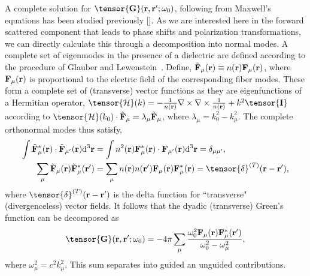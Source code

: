 \documentclass[preprint,aps,pra,onecolumn]{revtex4-1} %
\begin{document}
A complete solution for $\tensor{\mathbf{G}}(\br ,\br' ; \omega_0)$, following from Maxwell's equations 
has been studied previously [].  As we are interested here in the forward scattered component that 
leads to phase shifts and polarization transformations, we can directly calculate this through a 
decomposition into normal modes.  A complete set of eigenmodes in the presence of a dielectric are 
defined according to the procedure of Glauber and Lewenstein~\cite{Glauber1991}.  Define, 
$\tilde{\mathbf{F}}_\mu(\mathbf{r}) \equiv n(\mathbf{r}) \mathbf{F}_\mu (\mathbf{r})$, where $\mathbf{F}_\mu (\mathbf{r})$ is 
proportional to the electric field of the corresponding fiber modes.  These form a complete set of 
(transverse) vector functions as they are eigenfunctions of a Hermitian operator, 
$\tensor{\mathcal{H}}(k) = -\frac{1}{n(\br)}
\nabla\times\nabla\times \frac{1}{n(\br)} + k^2 \tensor{\mathbf{I}}$ according to 
$\tensor{\mathcal{H}}(k_0) \cdot \tilde{\mathbf{F}}_\mu = \lambda_\mu \tilde{\mathbf{F}}_\mu$, where 
$\lambda_\mu=k_0^2-k_\mu^2$.
The complete orthonormal modes thus satisfy,
\begin{align}
\int \tilde{\mathbf{F}}_\mu^* (\br)\cdot \tilde{\mathbf{F}}_{\mu'}(\br) \mathrm{d}^3\br &= \int n^2(\br) 
\mathbf{F}_\mu^* (\br)\cdot  \mathbf{F}_{\mu'}(\br) 
\mathrm{d}^3\br=\delta_{\mu\mu'},\label{eq:orthutrans}
\\
\sum_\mu \tilde{\mathbf{F}}_\mu (\br) \tilde{\mathbf{F}}_\mu^*(\br') &= \sum_\mu n(\br)n(\br') 
\mathbf{F}_\mu  (\br) \mathbf{F}_\mu^*(\br) =\tensor{\delta}^{(T)}(\br-\br'), 
\end{align}
where $\tensor{\delta}^{(T)}(\br-\br')$ is the  delta function for ``transverse" (divergenceless) vector 
fields.  It follows that the dyadic (transverse) Green's function can be decomposed as~\cite{Swedishguys}
\begin{equation}
\tensor{\mathbf{G}}(\br,\br'; \omega_0) = -4\pi \sum_{\mu} \frac{\omega_0^2\mathbf{F}_\mu (\br) 
\mathbf{F}^*_\mu (\br')}{\omega_0^2-\omega_\mu^2},
\end{equation}
where $\omega_\mu^2 = c^2 k_\mu^2$.  This sum separates into guided an unguided contributions. 
\end{document}
